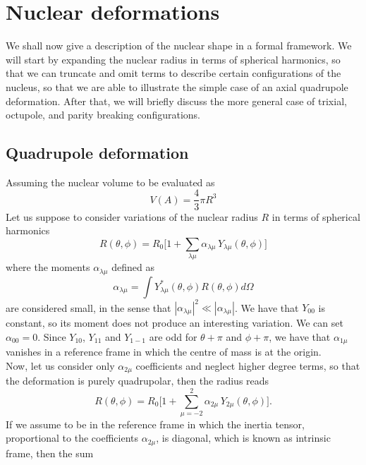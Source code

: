 \section{Nuclear deformations}
\label{sec:deformations}
We shall now give a description of the nuclear shape in a formal framework. We will start by expanding the nuclear radius in terms of spherical harmonics, so that we can truncate and omit terms to describe certain configurations of the nucleus, so that we are able to illustrate the simple case of an axial quadrupole deformation. After that, we will briefly discuss the more general case of trixial, octupole, and parity breaking configurations.
\subsection{Quadrupole deformation}
Assuming the nuclear volume to be evaluated as
\begin{equation}
    V(A) = \frac{4}{3}\pi R^3
\end{equation}
Let us suppose to consider variations of the nuclear radius $R$ in terms of spherical harmonics
\begin{equation}
    R(\theta, \phi) = R_0\bigg[1+\sum_{\lambda \mu}\alpha_{\lambda \mu}\,Y_{\lambda\mu}(\theta,\phi)\bigg]
\end{equation}
where the moments $\alpha_{\lambda \mu}$ defined as
\begin{equation}
    \alpha_{\lambda \mu}=\int Y_{\lambda\mu}^*(\theta, \phi)R(\theta, \phi) d\Omega
\end{equation}
are considered small, in the sense that $|\alpha_{\lambda \mu}| ^2 \ll |\alpha_{\lambda \mu}| $. We have that $Y_{00}$ is constant, so its moment does not produce an interesting variation. We can set $\alpha_{00}=0$. 
Since $Y_{10}$, $Y_{11}$ and $Y_{1-1}$ are odd for $\theta + \pi$ and $\phi + \pi$, we have that $\alpha_{1\mu}$ vanishes in a reference frame in which the centre of mass is at the origin.
\\Now, let us consider only $\alpha_{2\mu}$ coefficients and neglect higher degree terms, so that the deformation is purely quadrupolar, then the radius reads
\begin{equation}
    R(\theta, \phi) = R_0\bigg[1+\sum_{\mu=-2}^2\alpha_{2\mu}\,Y_{2\mu}(\theta, \phi)\bigg].
\end{equation}
If we assume to be in the reference frame in which the inertia tensor, proportional to the coefficients $\alpha_{2\mu}$, is diagonal, which is known as intrinsic frame, then the sum 
